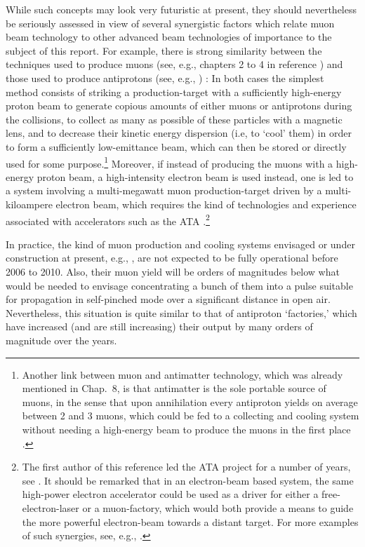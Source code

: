 \documentclass [12pt,a4paper,     ]{report} %
\begin{document}
While such concepts may look very futuristic at present, they should nevertheless be seriously assessed in view of several synergistic factors which relate muon beam technology to other advanced beam technologies of importance to the subject of this report.  For example, there is strong similarity between the techniques used to produce muons (see, e.g., chapters 2 to 4 in reference \cite{NEUFF1999-}) and those used to produce antiprotons (see, e.g., \cite{GSPON1987A}) :  In both cases the simplest method consists of striking a production-target with a sufficiently high-energy proton beam to generate copious amounts of either muons or antiprotons during the collisions, to collect as many as possible of these particles with a magnetic lens, and to decrease their kinetic energy dispersion (i.e, to `cool' them) in order to form a sufficiently low-emittance beam, which can then be stored or directly used for some purpose.\footnote{Another link between muon and antimatter technology, which was already mentioned in Chap.~8, is that antimatter is the sole portable source of muons, in the sense that upon annihilation every antiproton yields on average between 2 and 3 muons, which could be fed to a collecting and cooling system without needing a high-energy beam to produce the muons in the first place \cite{GSPON1987B}.}  Moreover, if instead of producing the muons with a high-energy proton beam, a high-intensity electron beam is used instead, one is led to a system involving a multi-megawatt muon production-target driven by a multi-kiloampere electron beam, which requires the kind of technologies and experience associated with accelerators such as the ATA \cite{BARLE1994-}.\footnote{The first author of this reference led the ATA project for a number of years, see \cite{BARLE1981A,BARLE1981B}. It should be remarked that in an electron-beam based system, the same high-power electron accelerator could be used as a driver for either a free-electron-laser or a muon-factory, which would both provide a means to guide the more powerful electron-beam towards a distant target. For more examples of such synergies, see, e.g., \cite{BARLE1986-}.}

In practice, the kind of muon production and cooling systems envisaged or under construction at present, e.g., \cite{NEUFF1999-, GEER-2001-}, are not expected to be fully operational before 2006 to 2010.  Also, their muon yield will be orders of magnitudes below what would be needed to envisage concentrating a bunch of them into a pulse suitable for propagation in self-pinched mode over a significant distance in open air.  Nevertheless, this situation is quite similar to that of antiproton `factories,' which have increased (and are still increasing) their output by many orders of magnitude over the years. 
\end{document}
